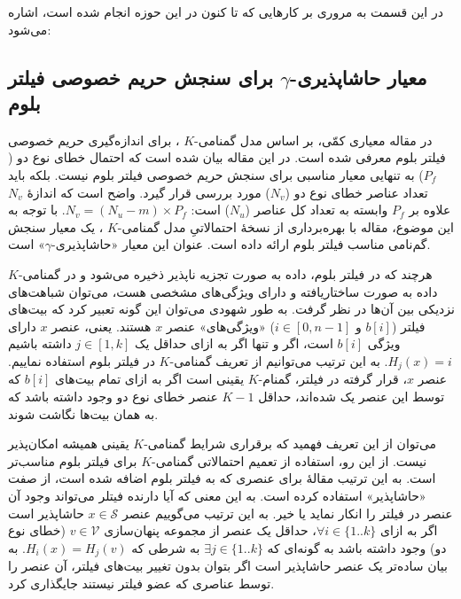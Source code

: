 در این قسمت به مروری بر کارهایی که تا کنون در این حوزه انجام شده است، اشاره می‌شود:

\subsection{معیار 
	حاشاپذیری-$\gamma$ برای
	سنجش حریم خصوصی فیلتر بلوم}
\label{gamma-deniability}

در مقاله \cite{Bianchi2012} معیاری کمّی، بر اساس مدل گمنامی-$K$ 
\cite{Sweeney2002}،
برای اندازه‌گیری حریم خصوصی فیلتر بلوم معرفی شده است. در این مقاله بیان شده است که احتمال خطای نوع دو ($P_f$) به تنهایی معیار مناسبی برای سنجش حریم خصوصی فیلتر بلوم نیست. بلکه باید تعداد عناصر خطای نوع دو ($N_v$) مورد بررسی قرار گیرد. واضح است که اندازهٔ $N_v$ علاوه بر $P_f$ وابسته به تعداد کل عناصر ($N_u$) است:
$N_v=(N_u-m)\times P_f$.
با توجه به این موضوع، مقاله \cite{Bianchi2012} با بهره‌برداری از نسخهٔ احتمالاتیِ مدل گمنامی-$K$
\cite{Lodha2008}،
یک معیار سنجش گم‌نامی مناسب فیلتر بلوم ارائه داده است. عنوان این معیار «حاشاپذیری-$\gamma$» است. 

هرچند که در فیلتر بلوم، داده به صورت تجزیه ناپذیر ذخیره می‌شود و در گمنامی-$K$ داده به صورت ساختاریافته و دارای ویژگی‌های مشخصی هست، می‌توان شباهت‌های نزدیکی بین آن‌ها در نظر گرفت. به طور شهودی می‌توان این گونه تعبیر کرد که بیت‌های فیلتر ($b[i]$ و $i\in[0,n-1]$) «ویژگی‌های» عنصر $x$ هستند. یعنی، عنصر $x$ دارای ویژگی $b[i]$ است، اگر و تنها اگر به ازای حداقل یک 
$j\in[1,k]$ داشته باشیم 
$H_j(x)=i$.
به این ترتیب می‌توانیم از تعریف گمنامی-$K$ در فیلتر بلوم استفاده نماییم. عنصر $x$، قرار گرفته در فیلتر، گمنام-$K$ یقینی است اگر به ازای تمام بیت‌های $b[i]$  که توسط این عنصر یک شده‌اند، حداقل $K-1$ عنصر خطای نوع دو وجود داشته باشد که به همان بیت‌ها نگاشت شوند.

می‌توان از این تعریف فهمید که برقراری شرایط گمنامی-$K$ یقینی همیشه امکان‌پذیر نیست. از این رو، استفاده از تعمیم احتمالاتی گمنامی-$K$ 
\cite{Lodha2008} 
برای فیلتر بلوم مناسب‌تر است. به این ترتیب مقالهٔ \cite{Bianchi2012} برای عنصری که به فیلتر بلوم اضافه شده است، از صفت «حاشاپذیر» استفاده کرده است.  به این معنی که آیا دارنده فیتلر می‌تواند وجود آن عنصر در فیلتر را انکار نماید یا خیر. به این ترتیب می‌گوییم عنصر $x\in \mathcal{S}$ حاشاپذیر است اگر به ازای 
$\forall i \in \{1..k\}$،
حداقل یک عنصر از مجموعه پنهان‌سازی $v\in \mathcal{V}$ (خطای نوع دو) وجود داشته باشد به گونه‌ای که 
$\exists j \in \{1..k\}$
به شرطی که 
$H_i(x) = H_j(v)$.
به بیان ساده‌تر یک عنصر حاشا‌پذیر است اگر بتوان بدون تغییر بیت‌های فیلتر، آن عنصر را توسط عناصری که عضو فیلتر نیستند جایگذاری کرد. 

